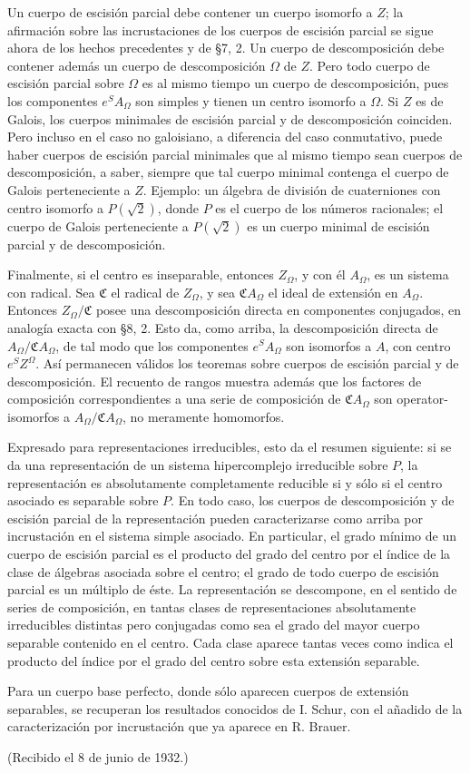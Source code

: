 Un cuerpo de escisión parcial debe contener un cuerpo isomorfo a \(Z\); la afirmación sobre las incrustaciones de los cuerpos de escisión parcial se sigue ahora de los hechos precedentes y de §7, 2. Un cuerpo de descomposición debe contener además un cuerpo de descomposición \(\Omega\) de \(Z\). Pero todo cuerpo de escisión parcial sobre \(\Omega\) es al mismo tiempo un cuerpo de descomposición, pues los componentes \(e^S A_\Omega\) son simples y tienen un centro isomorfo a \(\Omega\). Si \(Z\) es de Galois, los cuerpos minimales de escisión parcial y de descomposición coinciden. Pero incluso en el caso no galoisiano, a diferencia del caso conmutativo, puede haber cuerpos de escisión parcial minimales que al mismo tiempo sean cuerpos de descomposición, a saber, siempre que tal cuerpo minimal contenga el cuerpo de Galois perteneciente a \(Z\). Ejemplo: un álgebra de división de cuaterniones con centro isomorfo a \(P(\sqrt2)\), donde \(P\) es el cuerpo de los números racionales; el cuerpo de Galois perteneciente a \(P(\sqrt2)\) es un cuerpo minimal de escisión parcial y de descomposición.

Finalmente, si el centro es inseparable, entonces \(Z_\Omega\), y con él \(A_\Omega\), es un sistema con radical. Sea \(\mathfrak C\) el radical de \(Z_\Omega\), y sea \(\mathfrak C A_\Omega\) el ideal de extensión en \(A_\Omega\). Entonces \(Z_\Omega/\mathfrak C\) posee una descomposición directa en componentes conjugados, en analogía exacta con §8, 2. Esto da, como arriba, la descomposición directa de \(A_\Omega/\mathfrak C A_\Omega\), de tal modo que los componentes \(e^SA_\Omega\) son isomorfos a \(A\), con centro \(e^SZ^\Omega\). Así permanecen válidos los teoremas sobre cuerpos de escisión parcial y de descomposición. El recuento de rangos muestra además que los factores de composición correspondientes a una serie de composición de \(\mathfrak C A_\Omega\) son operator-isomorfos a \(A_\Omega/\mathfrak C A_\Omega\), no meramente homomorfos.

Expresado para representaciones irreducibles, esto da el resumen siguiente: si se da una representación de un sistema hipercomplejo irreducible sobre \(P\), la representación es absolutamente completamente reducible si y sólo si el centro asociado es separable sobre \(P\). En todo caso, los cuerpos de descomposición y de escisión parcial de la representación pueden caracterizarse como arriba por incrustación en el sistema simple asociado. En particular, el grado mínimo de un cuerpo de escisión parcial es el producto del grado del centro por el índice de la clase de álgebras asociada sobre el centro; el grado de todo cuerpo de escisión parcial es un múltiplo de éste. La representación se descompone, en el sentido de series de composición, en tantas clases de representaciones absolutamente irreducibles distintas pero conjugadas como sea el grado del mayor cuerpo separable contenido en el centro. Cada clase aparece tantas veces como indica el producto del índice por el grado del centro sobre esta extensión separable.

Para un cuerpo base perfecto, donde sólo aparecen cuerpos de extensión separables, se recuperan los resultados conocidos de I. Schur, con el añadido de la caracterización por incrustación que ya aparece en R. Brauer.

\begin{center}
(Recibido el 8 de junio de 1932.)
\end{center}
